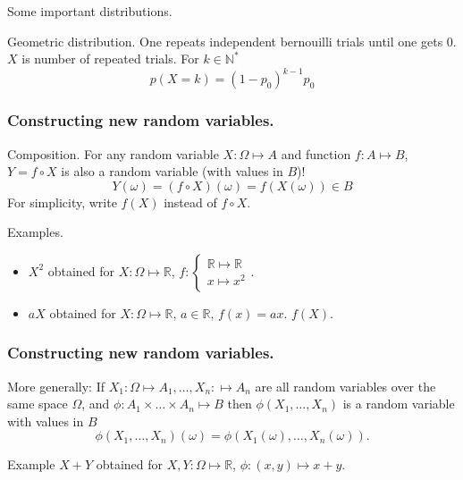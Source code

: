 \documentclass{beamer}
\begin{document}
\begin{frame}{Some important distributions.}
  \begin{exampleblock}{Geometric distribution.}
    One repeats independent bernouilli trials until one gets $0$. $X$ is number of repeated trials. For $k \in \mathbb{N}^*$
    \[p(X = k) = (1 - p_0)^{k-1}p_0\]
    
  \end{exampleblock}
\end{frame}

\begin{frame}
  \frametitle{Constructing new random variables.}
  \begin{block}{Composition.}
    For any random variable $X: \Omega \mapsto A$ and function $f: A \mapsto B$, $Y = f \circ X$ is also a random variable (with values in $B$)!
    \[Y(\omega) = (f \circ X) (\omega) = f(X(\omega)) \in B\]
    For simplicity, write $f(X)$ instead of $f \circ X$. 
  \end{block}
  \begin{exampleblock}{Examples.}
    \begin{itemize}
    \item $X^2$ obtained for $X: \Omega \mapsto \mathbb{R}$, $f: \left \{ \begin{array}{l} \mathbb{R} \mapsto \mathbb{R}\\ x \mapsto x^2 \end{array} \right .$.
    \item $aX$ obtained for $X: \Omega \mapsto \mathbb{R}$, $a \in \mathbb{R}$, $f(x) = a x$. $f(X)$.
    \end{itemize}
  \end{exampleblock}
\end{frame}

\begin{frame}
  \frametitle{Constructing new random variables.}
  \begin{block}{More generally:}
    If $X_1 : \Omega \mapsto A_1, \dots, X_n: \mapsto A_n$ are all random variables over the same space $\Omega$, and $\phi: A_1 \times \dots \times A_n \mapsto B$ then $\phi(X_1, \dots, X_n)$ is a random variable with values in $B$
    \[\phi(X_1, \dots, X_n)(\omega) = \phi(X_1(\omega), \dots, X_n(\omega)).\]
  \end{block}

  \begin{exampleblock}{Example}
     $X + Y$ obtained for $X, Y: \Omega \mapsto \mathbb{R}$, $\phi: (x,y) \mapsto x + y$.
  \end{exampleblock}
  
  
\end{frame}
\end{document}
